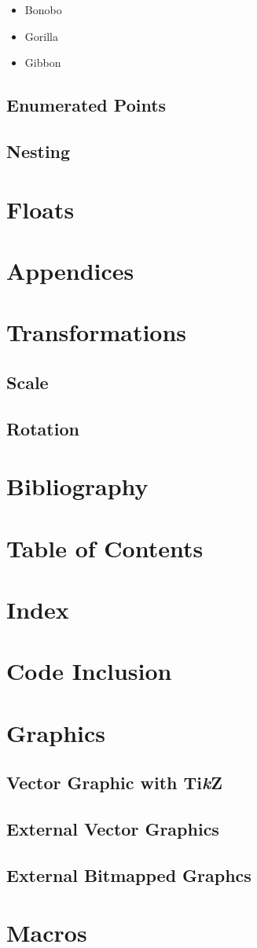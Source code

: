 \begin{itemize}
  \item Bonobo
  \item Gorilla
  \item Gibbon
\end{itemize}

\subsection{Enumerated Points}
\subsection{Nesting}

\section{Floats}

\section{Appendices}

\section{Transformations}
\subsection{Scale}
\subsection{Rotation}

\section{Bibliography}
\section{Table of Contents}
\section{Index}

\section{Code Inclusion}

\section{Graphics}
\subsection{Vector Graphic with Ti\textit{k}Z}
\subsection{External Vector Graphics}
\subsection{External Bitmapped Graphcs}

\section{Macros}



